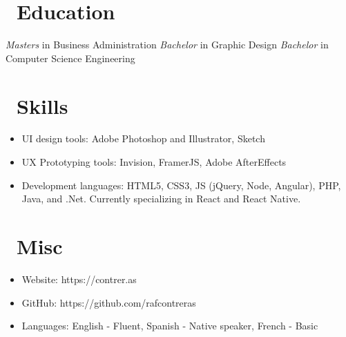 \documentclass{resume}
\begin{document}
\section{\faGraduationCap\ Education}
\textit{Masters} in Business Administration
\textit{Bachelor} in Graphic Design
\textit{Bachelor} in Computer Science Engineering

\section{\faCogs\ Skills}
\begin{itemize}[parsep=0.5ex]
  \item UI design tools: Adobe Photoshop and Illustrator, Sketch
  \item UX Prototyping tools: Invision, FramerJS, Adobe AfterEffects
  \item Development languages: HTML5, CSS3, JS (jQuery, Node, Angular), PHP, Java, and .Net. Currently specializing in React and React Native.
\end{itemize}

\section{\faInfo\ Misc}
\begin{itemize}[parsep=0.5ex]
  \item Website: https://contrer.as
  \item GitHub: https://github.com/rafcontreras
  \item Languages: English - Fluent, Spanish - Native speaker, French - Basic
\end{itemize}

%
%
\end{document}
